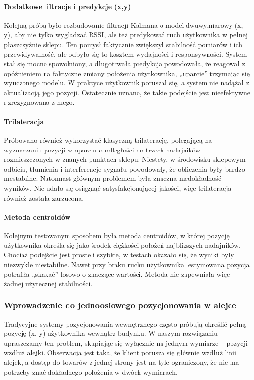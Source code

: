 \paragraph{Dodatkowe filtracje i predykcje (x,y)}
Kolejną próbą było rozbudowanie filtracji Kalmana o model dwuwymiarowy (x, y), aby nie tylko wygładzać RSSI, ale też predykować ruch użytkownika w pełnej płaszczyźnie sklepu. Ten pomysł faktycznie zwiększył stabilność pomiarów i ich przewidywalność, ale odbyło się to kosztem wydajności i responsywności. System stał się mocno spowolniony, a długotrwała predykcja powodowała, że reagował z opóźnieniem na faktyczne zmiany położenia użytkownika, „uparcie” trzymając się wyuczonego modelu. W praktyce użytkownik poruszał się, a system nie nadążał z aktualizacją jego pozycji. Ostatecznie uznano, że takie podejście jest nieefektywne i zrezygnowano z niego.

\paragraph{Trilateracja}
Próbowano również wykorzystać klasyczną trilaterację, polegającą na wyznaczaniu pozycji w oparciu o odległości do trzech nadajników rozmieszczonych w znanych punktach sklepu. Niestety, w środowisku sklepowym odbicia, tłumienia i interferencje sygnału powodowały, że obliczenia były bardzo niestabilne. Natomiast głównym problemem była znaczna niedokładność wyników. Nie udało się osiągnąć satysfakcjonującej jakości, więc trilateracja również została zarzucona.

\paragraph{Metoda centroidów}
Kolejnym testowanym sposobem była metoda centroidów, w której pozycję użytkownika określa się jako środek ciężkości położeń najbliższych nadajników. Chociaż podejście jest proste i szybkie, w testach okazało się, że wyniki były niezwykle niestabilne. Nawet przy braku ruchu użytkownika, estymowana pozycja potrafiła „skakać” losowo o znaczące wartości. Metoda nie zapewniała więc żadnej użytecznej stabilności.

\subsubsection{Wprowadzenie do jednoosiowego pozycjonowania w alejce}
Tradycyjne systemy pozycjonowania wewnętrznego często próbują określić pełną pozycję (x, y) użytkownika wewnątrz budynku. W naszym rozwiązaniu upraszczamy ten problem, skupiając się wyłącznie na jednym wymiarze – pozycji wzdłuż alejki. Obserwacja jest taka, że klient porusza się głównie wzdłuż linii alejek, a dostęp do towarów z jednej strony jest na tyle ograniczony, że nie ma potrzeby znać dokładnego położenia w dwóch wymiarach.

